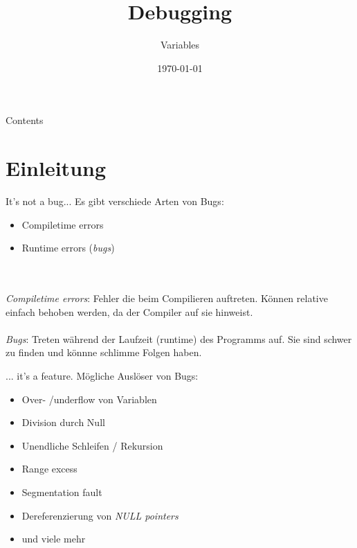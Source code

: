 


\title{Debugging}
\subtitle{Variables}
\date{\today}





\maketitle


\begin{frame}{Contents}
	\tableofcontents
\end{frame}

\section{Einleitung}

\begin{frame}{It's not a bug...}
	Es gibt verschiede Arten von Bugs:
	\begin{itemize}
		\item Compiletime errors
		\item Runtime errors (\textit{bugs})
	\end{itemize}\ \\\ \\
	\textit{Compiletime errors}: Fehler die beim Compilieren auftreten. K\"onnen relative einfach behoben werden, da der Compiler auf sie hinweist.\\\ \\
	\textit{Bugs}: Treten während der Laufzeit (runtime) des Programms auf. Sie sind schwer zu finden und könnne schlimme Folgen haben.
\end{frame}


\begin{frame}{... it's a feature.}
	Mögliche Auslöser von Bugs:
	\begin{itemize}
		\item Over- /underflow von Variablen
		\item Division durch Null 
		\item Unendliche Schleifen / Rekursion
		\item Range excess
		\item Segmentation fault
		\item Dereferenzierung von \textit{NULL pointers}
		\item und viele mehr
	\end{itemize}
\end{frame}

